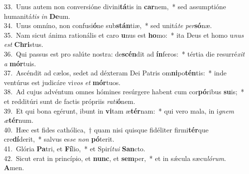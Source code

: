 {33.~}Unus autem non conversióne divini\textbf{tá}tis in \textbf{car}nem,~* sed assumptióne humanitá\textit{tis} \textit{in} \textbf{De}um.\\
{34.~}Unus omníno, non confusi\textbf{ó}ne sub\textbf{stán}tiæ,~* sed unitá\textit{te} \textit{per}\textbf{só}næ.\\
{35.~}Nam sicut ánima rationális et caro \textbf{u}nus est \textbf{ho}mo:~* ita Deus et homo u\textit{nus} \textit{est} \textbf{Chri}stus.\\
{36.~}Qui passus est pro salúte nostra: de\textbf{scén}dit ad \textbf{ín}feros:~* tértia die resurré\textit{xit} \textit{a} \textbf{mór}tuis.\\
{37.~}Ascéndit ad cælos, sedet ad déxteram Dei Patris om\textbf{ni}po\textbf{tén}tis:~* inde ventúrus est judicáre vi\textit{vos} \textit{et} \textbf{mór}tuos.\\
{38.~}Ad cujus advéntum omnes hómines resúrgere habent cum cor\textbf{pó}ribus \textbf{su}is;~* et redditúri sunt de factis própriis \textit{ra}\textit{ti}\textbf{ó}nem.\\
{39.~}Et qui bona egérunt, ibunt in \textbf{vi}tam æ\textbf{tér}nam:~* qui vero mala, in i\textit{gnem} \textit{æ}\textbf{tér}num.\\
{40.~}Hæc est fides cathólica,~† quam nisi quisque fidéliter firmi\textbf{tér}que cre\textbf{dí}derit,~* salvus es\textit{se} \textit{non} \textbf{pó}terit.\\
{41.~}Glória \textbf{Pa}tri, et \textbf{Fí}lio,~* et Spirí\textit{tu}\textit{i} \textbf{San}cto.\\
{42.~}Sicut erat in princípio, et \textbf{nunc}, et \textbf{sem}per,~* et in sǽcula sæcu\textit{ló}\textit{rum}. \textbf{A}men.\\
